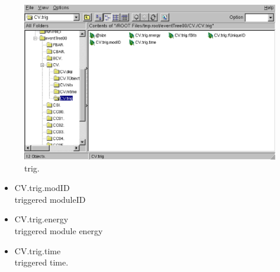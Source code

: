 \documentclass[a4paper,12pt]{article}
\begin{document}
    
    \begin{figure}[H]
     \begin{center}
      \includegraphics[scale=0.5]{xwd/trig.eps}
     \end{center}
     \caption{trig.}
    \end{figure}
    
    \begin{itemize}
     \item CV.trig.modID\\
	   triggered moduleID
     \item CV.trig.energy\\
	   triggered module energy
     \item CV.trig.time\\
	   triggered time.
    \end{itemize}
    
 \newpage
 \appendix
\end{document}
